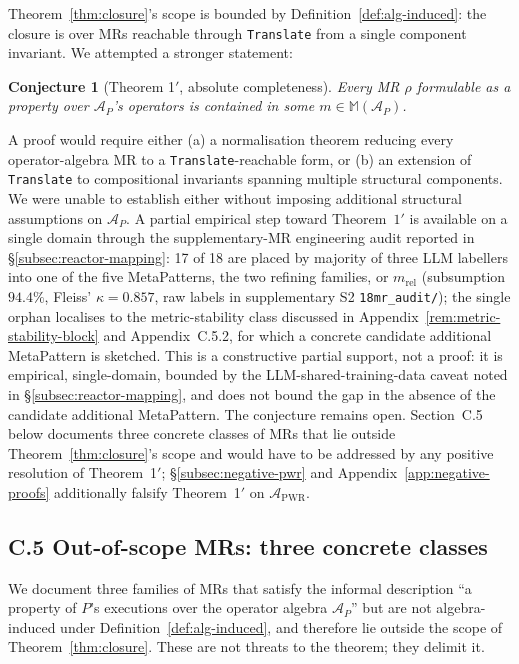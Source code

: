 \documentclass[acmsmall,screen,review]{acmart}
\newtheorem*{conjecture*}{Conjecture}
\begin{document}
Theorem~\ref{thm:closure}'s scope is bounded by Definition~\ref{def:alg-induced}: the closure is over MRs reachable through \texttt{Translate} from a single component invariant. We attempted a stronger statement:

\begin{conjecture*}[Theorem 1$'$, absolute completeness]
\label{conj:absolute}
Every MR $\rho$ formulable as a property over $\mathcal{A}_P$'s operators is contained in some $m \in \mathbb{M}(\mathcal{A}_P)$.
\end{conjecture*}

A proof would require either (a) a normalisation theorem reducing every operator-algebra MR to a \texttt{Translate}-reachable form, or (b) an extension of \texttt{Translate} to compositional invariants spanning multiple structural components. We were unable to establish either without imposing additional structural assumptions on $\mathcal{A}_P$. A partial empirical step toward Theorem~$1'$ is available on a single domain through the supplementary-MR engineering audit reported in \S\ref{subsec:reactor-mapping}: 17 of 18 are placed by majority of three LLM labellers into one of the five MetaPatterns, the two refining families, or $m_{\mathrm{rel}}$ (subsumption $94.4\%$, Fleiss' $\kappa = 0.857$, raw labels in supplementary S2 \texttt{18mr\_audit/}); the single orphan localises to the metric-stability class discussed in Appendix~\ref{rem:metric-stability-block} and Appendix~C.5.2, for which a concrete candidate additional MetaPattern is sketched. This is a constructive partial support, not a proof: it is empirical, single-domain, bounded by the LLM-shared-training-data caveat noted in \S\ref{subsec:reactor-mapping}, and does not bound the gap in the absence of the candidate additional MetaPattern. The conjecture remains open. Section~C.5 below documents three concrete classes of MRs that lie outside Theorem~\ref{thm:closure}'s scope and would have to be addressed by any positive resolution of Theorem~1$'$; \S\ref{subsec:negative-pwr} and Appendix~\ref{app:negative-proofs} additionally falsify Theorem~1$'$ on $\mathcal{A}_{\mathrm{PWR}}$.

\subsection*{C.5 Out-of-scope MRs: three concrete classes}
\label{app:out-of-scope}

We document three families of MRs that satisfy the informal description ``a property of $P$'s executions over the operator algebra $\mathcal{A}_P$'' but are not algebra-induced under Definition~\ref{def:alg-induced}, and therefore lie outside the scope of Theorem~\ref{thm:closure}. These are not threats to the theorem; they delimit it.
\end{document}
